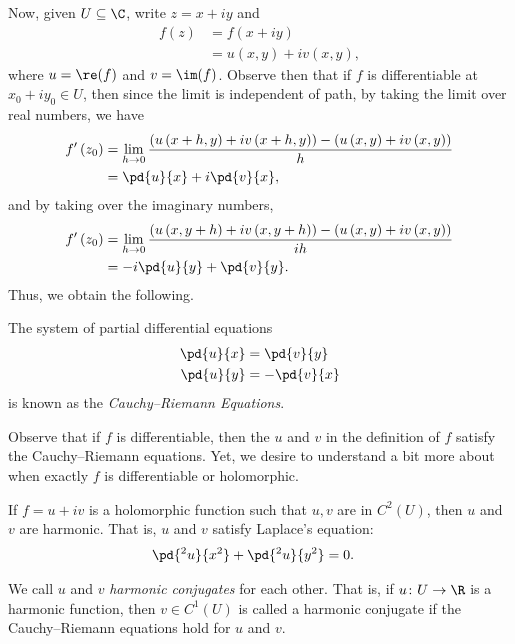 \documentclass[10pt]{mypackage}
\begin{document}
Now, given $U\subseteq \C$, write $z = x + iy$ and
\begin{align*}
  f\left( z \right) &= f\left( x + iy \right)\\
                    &= u\left( x,y \right) + iv\left( x,y \right),
\end{align*}
where $u = \re(f)$ and $v = \im(f)$. Observe then that if $f$ is differentiable at $x_0 + iy_0\in U$, then since the limit is independent of path, by taking the limit over real numbers, we have
\begin{align*}
  f'\left( z_0 \right) &= \lim_{h\rightarrow 0} \frac{\left( u\left( x + h,y \right) + iv\left( x + h,y \right) \right) - \left( u\left( x,y \right) + iv\left( x,y \right) \right)}{ h }\\
                       &= \pd{u}{x} + i \pd{v}{x},
\end{align*}
and by taking over the imaginary numbers,
\begin{align*}
  f'\left( z_0 \right) &= \lim_{h\rightarrow 0} \frac{\left( u\left( x,y+h \right) + iv\left( x,y+h \right) \right) - \left( u\left( x,y \right) + iv\left( x,y \right) \right)}{ih}\\
                       &= -i \pd{u}{y} + \pd{v}{y}.
\end{align*}
Thus, we obtain the following.
\begin{definition}
  The system of partial differential equations
  \begin{align*}
    \pd{u}{x} &= \pd{v}{y}\\
    \pd{u}{y} &= - \pd{v}{x}
  \end{align*}
  is known as the \textit{Cauchy--Riemann Equations}.
\end{definition}
Observe that if $f$ is differentiable, then the $u$ and $v$ in the definition of $f$ satisfy the Cauchy--Riemann equations. Yet, we desire to understand a bit more about when exactly $f$ is differentiable or holomorphic.
\begin{proposition}
  If $f = u + iv$ is a holomorphic function such that $u,v$ are in $C^{2}\left( U \right)$, then $u$ and $v$ are harmonic. That is, $u$ and $v$ satisfy Laplace's equation:
  \begin{align*}
    \pd{^2u}{x^2} + \pd{^2u}{y^2} &= 0.
  \end{align*}
\end{proposition}
We call $u$ and $v$ \textit{harmonic conjugates} for each other. That is, if $u\colon U\rightarrow \R$ is a harmonic function, then $v\in C^{1}\left( U \right)$ is called a harmonic conjugate if the Cauchy--Riemann equations hold for $u$ and $v$.
\end{document}
